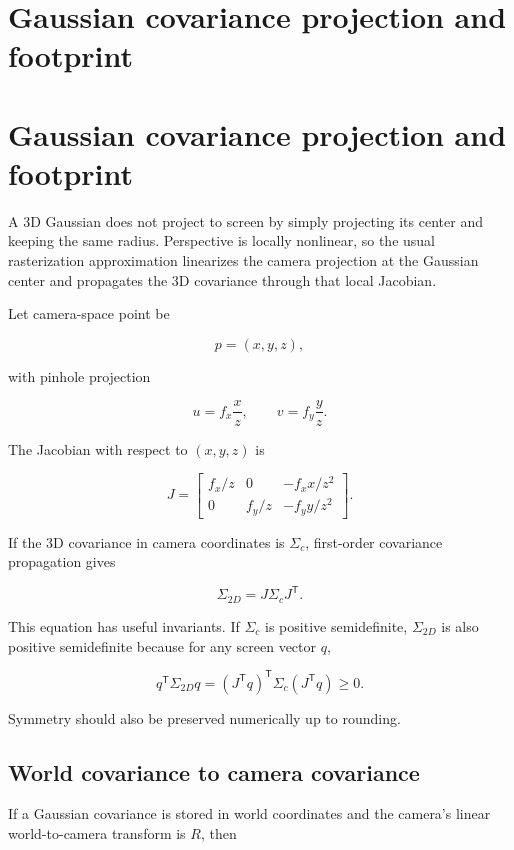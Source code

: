 \hypertarget{appendix-24269cb6977c}{}
\section*{Gaussian covariance projection and footprint}
\section{Gaussian covariance projection and footprint}\label{gaussian-covariance-projection-and-footprint}

A 3D Gaussian does not project to screen by simply projecting its center and keeping the same radius. Perspective is locally nonlinear, so the usual rasterization approximation linearizes the camera projection at the Gaussian center and propagates the 3D covariance through that local Jacobian.

Let camera-space point be

\[
p=(x,y,z),
\]

with pinhole projection

\[
u=f_x\frac{x}{z},
\qquad
v=f_y\frac{y}{z}.
\]

The Jacobian with respect to \((x,y,z)\) is

\[
J=
\begin{bmatrix}
f_x/z & 0 & -f_xx/z^2\\
0 & f_y/z & -f_yy/z^2
\end{bmatrix}.
\]

If the 3D covariance in camera coordinates is \(\Sigma_c\), first-order covariance propagation gives

\[
\Sigma_{2D}=J\Sigma_cJ^{\mathsf T}.
\]

This equation has useful invariants. If \(\Sigma_c\) is positive semidefinite, \(\Sigma_{2D}\) is also positive semidefinite because for any screen vector \(q\),

\[
q^{\mathsf T}\Sigma_{2D}q
=
(J^{\mathsf T}q)^{\mathsf T}\Sigma_c(J^{\mathsf T}q)
\ge0.
\]

Symmetry should also be preserved numerically up to rounding.

\subsection{World covariance to camera covariance}\label{world-covariance-to-camera-covariance}

If a Gaussian covariance is stored in world coordinates and the camera's linear world-to-camera transform is \(R\), then


